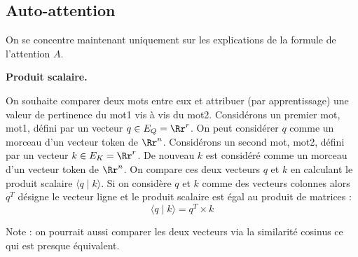 \documentclass[11pt,class=report,crop=false]{standalone}
\begin{document}
\subsection{Auto-attention}

On se concentre maintenant uniquement sur les explications de la formule de l'attention $A$.


\textbf{Produit scalaire.}

On souhaite comparer deux mots entre eux et attribuer (par apprentissage) une valeur de pertinence du mot1 vis à vis du mot2. Considérons un premier mot, mot1, défini par un vecteur $q \in E_Q = \Rr^r$. On peut considérer $q$ comme un morceau d'un vecteur token de $\Rr^n$.
Considérons un second mot, mot2, défini par un vecteur $k \in E_K = \Rr^r$.
De nouveau $k$ est considéré comme un morceau d'un vecteur token de $\Rr^n$.
On compare ces deux vecteurs $q$ et $k$ en calculant le produit scalaire $\langle q \mid k \rangle$.
Si on considère $q$ et $k$ comme des vecteurs colonnes alors $q^T$ désigne le vecteur ligne et le produit scalaire est égal au produit de matrices :
$$\langle q \mid k \rangle = q^T \times k$$

Note : on pourrait aussi comparer les deux vecteurs via la similarité cosinus ce qui est presque équivalent.
\end{document}
